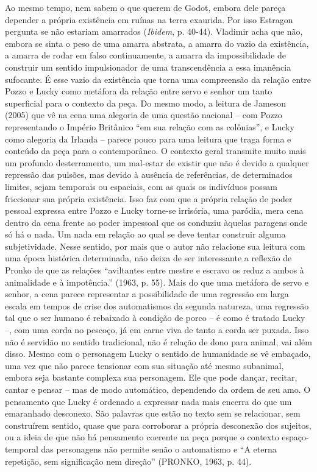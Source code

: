 Ao mesmo tempo, nem sabem o que querem de Godot, embora dele pareça
depender a própria existência em ruínas na terra exaurida. Por isso
Estragon pergunta se não estariam amarrados (\emph{Ibidem}, p. 40-44).
Vladimir acha que não, embora se sinta o peso de uma amarra abstrata, a
amarra do vazio da existência, a amarra de rodar em falso continuamente,
a amarra da impossibilidade de construir um sentido impulsionador de uma
transcendência a essa imanência sufocante. É esse vazio da existência
que torna uma compreensão da relação entre Pozzo e Lucky como metáfora
da relação entre servo e senhor um tanto superficial para o contexto da
peça. Do mesmo modo, a leitura de Jameson (2005) que vê na cena uma
alegoria de uma questão nacional -- com Pozzo representando o Império
Britânico ``em sua relação com as colônias'', e Lucky como alegoria da
Irlanda -- parece pouco para uma leitura que traga forma e conteúdo da
peça para o contemporâneo. O contexto geral transmite muito mais um
profundo desterramento, um mal-estar de existir que não é devido a
qualquer repressão das pulsões, mas devido à ausência de referências, de
determinados limites, sejam temporais ou espaciais, com as quais os
indivíduos possam friccionar sua própria existência. Isso faz com que a
própria relação de poder pessoal expressa entre Pozzo e Lucky torne-se
irrisória, uma paródia, mera cena dentro da cena frente ao poder
impessoal que os conduziu àquelas paragens onde só há o nada. Um nada em
relação ao qual se deve tentar construir alguma subjetividade. Nesse
sentido, por mais que o autor não relacione sua leitura com uma época
histórica determinada, não deixa de ser interessante a reflexão de
Pronko de que as relações ``aviltantes entre mestre e escravo os reduz a
ambos à animalidade e à impotência.'' (1963, p. 55). Mais do que uma
metáfora de servo e senhor, a cena parece representar a possibilidade de
uma regressão em larga escala em tempos de crise dos automatismos da
segunda natureza, uma regressão tal que o ser humano é rebaixado à
condição de porco -- é como é tratado Lucky --, com uma corda no
pescoço, já em carne viva de tanto a corda ser puxada. Isso não é
servidão no sentido tradicional, não é relação de dono para animal, vai
além disso. Mesmo com o personagem Lucky o sentido de humanidade se vê
embaçado, uma vez que não parece tensionar com sua situação até mesmo
subanimal, embora seja bastante complexa sua personagem. Ele que pode
dançar, recitar, cantar e pensar -- mas de modo automático, dependendo
da ordem de seu amo. O pensamento que Lucky é ordenado a expressar nada
mais encerra do que um emaranhado desconexo. São palavras que estão no
texto sem se relacionar, sem construírem sentido, quase que para
corroborar a própria desconexão dos sujeitos, ou a ideia de que não há
pensamento coerente na peça porque o contexto espaço-temporal das
personagens não permite senão o automatismo e ``A eterna repetição, sem
significação nem direção'' (PRONKO, 1963, p. 44).

